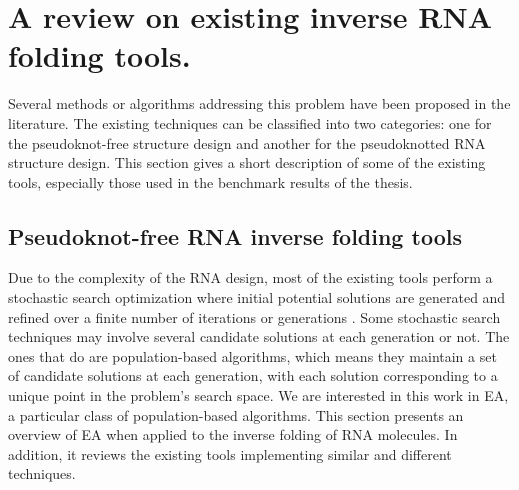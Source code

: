 \section{A review on existing inverse RNA folding tools.}

Several methods or algorithms addressing this problem have been proposed in the literature. The existing techniques can be classified into two categories: one for the pseudoknot-free structure design and another for the pseudoknotted \ac{RNA} structure design. This section gives a short description of some of the existing tools, especially those used in the benchmark results of the thesis.

\subsection{Pseudoknot-free RNA inverse folding tools}
Due to the complexity of the \ac{RNA} design,  most of the existing tools perform a stochastic search optimization where initial potential solutions are generated and refined over a finite number of iterations or generations \cite{esmaili2015erd,dromi2008reconstruction,esmaili2014evolutionary,taneda2011modena,nemo2018}. Some stochastic search techniques may involve several candidate solutions at each generation or not. The ones that do are population-based algorithms, which means they maintain a set of candidate solutions at each generation, with each solution corresponding to a unique point in the problem's search space.
We are interested in this work in \ac{EA}, a particular class of population-based algorithms. This section presents an overview of \ac{EA} when applied to the inverse folding of \ac{RNA} molecules. In addition, it reviews the existing tools implementing similar and different techniques.
